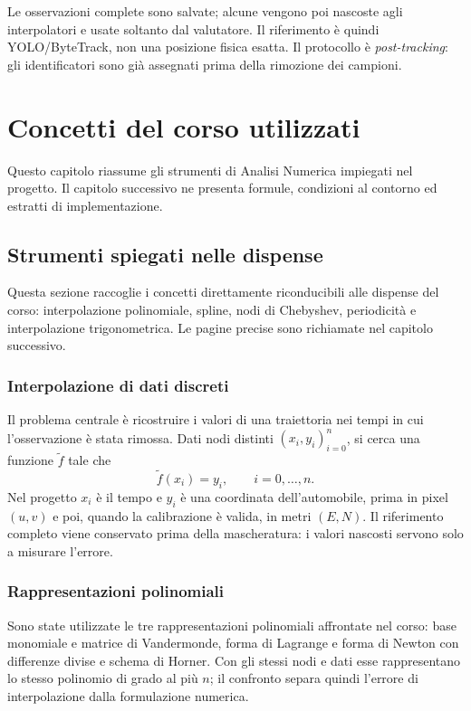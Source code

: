 \documentclass[11pt,a4paper]{article}
\numberwithin{equation}{section}
\begin{document}
Le osservazioni complete sono salvate; alcune vengono poi nascoste agli
interpolatori e usate soltanto dal valutatore. Il riferimento è quindi
YOLO/ByteTrack, non una posizione fisica esatta. Il protocollo è
\emph{post-tracking}: gli identificatori sono già assegnati prima della
rimozione dei campioni.

\section{Concetti del corso utilizzati}

Questo capitolo riassume gli strumenti di Analisi Numerica impiegati nel
progetto. Il capitolo successivo ne presenta formule, condizioni al
contorno ed estratti di implementazione.

\subsection{Strumenti spiegati nelle dispense}

Questa sezione raccoglie i concetti direttamente riconducibili alle
dispense del corso: interpolazione polinomiale, spline, nodi di Chebyshev,
periodicità e interpolazione trigonometrica. Le pagine precise sono
richiamate nel capitolo successivo.

\subsubsection{Interpolazione di dati discreti}

Il problema centrale è ricostruire i valori di una traiettoria nei tempi
in cui l'osservazione è stata rimossa. Dati nodi distinti
$(x_i,y_i)_{i=0}^n$, si cerca una funzione $\widetilde f$ tale che
\[
 \widetilde f(x_i)=y_i,\qquad i=0,\ldots,n.
\]
Nel progetto $x_i$ è il tempo e $y_i$ è una coordinata dell'automobile,
prima in pixel $(u,v)$ e poi, quando la calibrazione è valida, in metri
$(E,N)$. Il riferimento completo viene conservato prima della
mascheratura: i valori nascosti servono solo a misurare l'errore.

\subsubsection{Rappresentazioni polinomiali}

Sono state utilizzate le tre rappresentazioni polinomiali affrontate nel
corso: base monomiale e matrice di Vandermonde, forma di Lagrange e forma
di Newton con differenze divise e schema di Horner. Con gli stessi nodi e
dati esse rappresentano lo stesso polinomio di grado al più $n$; il
confronto separa quindi l'errore di interpolazione dalla formulazione
numerica.
\end{document}

